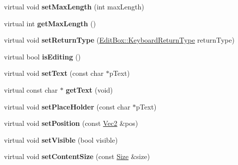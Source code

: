 \begin{DoxyCompactItemize}
\item 
\mbox{\label{classui_1_1EditBoxImplWin_a9ff222cb9996c91aff0b946e4ceef436}} 
virtual void {\bfseries set\+Max\+Length} (int max\+Length)
\item 
\mbox{\label{classui_1_1EditBoxImplWin_a2396a99bad24b9969da2f91bb09838e7}} 
virtual int {\bfseries get\+Max\+Length} ()
\item 
\mbox{\label{classui_1_1EditBoxImplWin_a6cf5b063ee67cc98c6be34c909b29bbf}} 
virtual void {\bfseries set\+Return\+Type} (\hyperlink{classui_1_1EditBox_a1e1285b6f742975b26bdeb8108ca6e51}{Edit\+Box\+::\+Keyboard\+Return\+Type} return\+Type)
\item 
\mbox{\label{classui_1_1EditBoxImplWin_ae0cebcaba27e20c1b721718dca07616c}} 
virtual bool {\bfseries is\+Editing} ()
\item 
\mbox{\label{classui_1_1EditBoxImplWin_ae45ac687662972608cb5b6f674283f06}} 
virtual void {\bfseries set\+Text} (const char $\ast$p\+Text)
\item 
\mbox{\label{classui_1_1EditBoxImplWin_ac3bbbec6e12bef24bd49a8e908d4038e}} 
virtual const char $\ast$ {\bfseries get\+Text} (void)
\item 
\mbox{\label{classui_1_1EditBoxImplWin_ad4819b50908b45358b34e5301d0c0c5d}} 
virtual void {\bfseries set\+Place\+Holder} (const char $\ast$p\+Text)
\item 
\mbox{\label{classui_1_1EditBoxImplWin_a924015b3a5c4c67f87467951fc753558}} 
virtual void {\bfseries set\+Position} (const \hyperlink{classVec2}{Vec2} \&pos)
\item 
\mbox{\label{classui_1_1EditBoxImplWin_abd9fa9c75bbbfc37a2cf61d61f7e906a}} 
virtual void {\bfseries set\+Visible} (bool visible)
\item 
\mbox{\label{classui_1_1EditBoxImplWin_a4445746986c0f4fd11a8c2b931845f02}} 
virtual void {\bfseries set\+Content\+Size} (const \hyperlink{classSize}{Size} \&size)

\end{DoxyCompactItemize}
